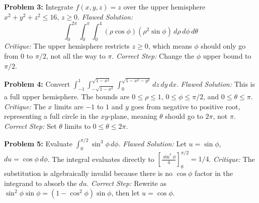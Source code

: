\documentclass[12pt]{article}
\begin{document}
\textbf{Problem 3:} Integrate $f(x,y,z) = z$ over the upper hemisphere $x^2+y^2+z^2 \le 16$, $z \ge 0$.
\textit{Flawed Solution:}
\[ \int_0^{2\pi} \int_0^\pi \int_0^4 (\rho\cos\phi)(\rho^2\sin\phi) \, d\rho \, d\phi \, d\theta \]
\textit{Critique:} The upper hemisphere restricts $z \ge 0$, which means $\phi$ should only go from $0$ to $\pi/2$, not all the way to $\pi$.
\textit{Correct Step:} Change the $\phi$ upper bound to $\pi/2$.

\textbf{Problem 4:} Convert $\int_{-1}^1 \int_{-\sqrt{1-x^2}}^{\sqrt{1-x^2}} \int_{0}^{\sqrt{1-x^2-y^2}} d z \, d y \, d x$.
\textit{Flawed Solution:}
This is a full upper hemisphere. The bounds are $0 \le \rho \le 1$, $0 \le \phi \le \pi/2$, and $0 \le \theta \le \pi$.
\textit{Critique:} The $x$ limits are $-1$ to $1$ and $y$ goes from negative to positive root, representing a full circle in the $xy$-plane, meaning $\theta$ should go to $2\pi$, not $\pi$.
\textit{Correct Step:} Set $\theta$ limits to $0 \le \theta \le 2\pi$.

\textbf{Problem 5:} Evaluate $\int_0^{\pi/2} \sin^3\phi \, d\phi$.
\textit{Flawed Solution:}
Let $u = \sin\phi$, $du = \cos\phi \, d\phi$. The integral evaluates directly to $[\frac{\sin^4\phi}{4}]_0^{\pi/2} = 1/4$.
\textit{Critique:} The substitution is algebraically invalid because there is no $\cos\phi$ factor in the integrand to absorb the $du$.
\textit{Correct Step:} Rewrite as $\sin^2\phi \sin\phi = (1-\cos^2\phi)\sin\phi$, then let $u = \cos\phi$.
\end{document}
